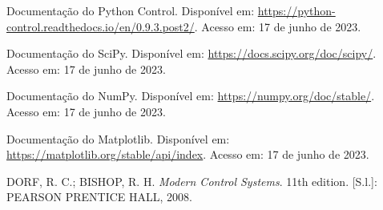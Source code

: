 \documentclass[10pt]{article}
\begin{document}
\begin{thebibliography}{99}
     Documentação do Python Control. Disponível em: \url{https://python-control.readthedocs.io/en/0.9.3.post2/}. Acesso em: 17 de junho de 2023.
    
     Documentação do SciPy. Disponível em: \url{https://docs.scipy.org/doc/scipy/}. Acesso em: 17 de junho de 2023.

     Documentação do NumPy. Disponível em: \url{https://numpy.org/doc/stable/}. Acesso em: 17 de junho de 2023.
    
     Documentação do Matplotlib. Disponível em: \url{https://matplotlib.org/stable/api/index}. Acesso em: 17 de junho de 2023.

     DORF, R. C.; BISHOP, R. H. \textit{Modern Control Systems}. 11th edition. [S.l.]: PEARSON PRENTICE HALL, 2008.
\end{thebibliography}
\end{document}
